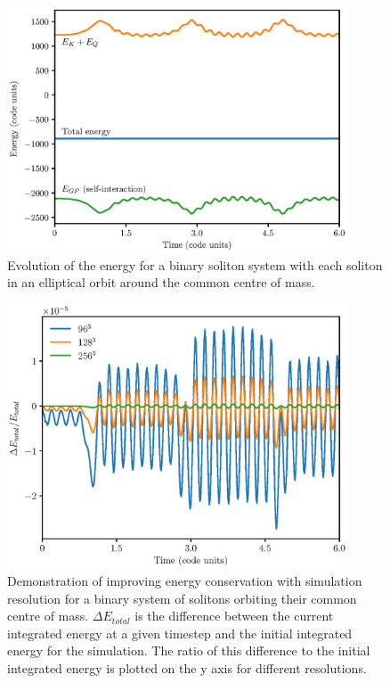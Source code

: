 \documentclass[a4paper,11pt]{article}
\begin{document}
\begin{figure}
  \includegraphics[width=0.9\textwidth,trim=0 0 2cm 2cm,clip]{egy_m=22.eps}
  \caption{Evolution of the energy for a binary soliton system with each soliton in an elliptical orbit around the common centre of mass.}
  \label{fig:binary}
\end{figure}

\begin{figure}
  \includegraphics[width=0.9\textwidth,trim=0 0.5cm 0 0,clip]{Total_Energy_Change.eps}
  \caption{Demonstration of improving energy conservation with simulation resolution for a binary system of solitons orbiting their common centre of mass. $\Delta E_{total}$ is the difference between the current integrated energy at a given timestep and the initial integrated energy for the simulation. The ratio of this difference to the initial integrated energy is plotted on the y axis for different resolutions.}
  \label{fig:energy_change}
\end{figure}
\end{document}
